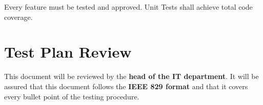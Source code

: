 \documentclass[12pt]{article}
\begin{document}
\par Every feature must be tested and approved. Unit Tests shall achieve total code coverage.

\section*{Test Plan Review}

This document will be reviewed by the \textbf{head of the IT department}. It will be assured that this document follows the \textbf{IEEE 829 format} and that it covers every bullet point of the testing procedure.
\end{document}
